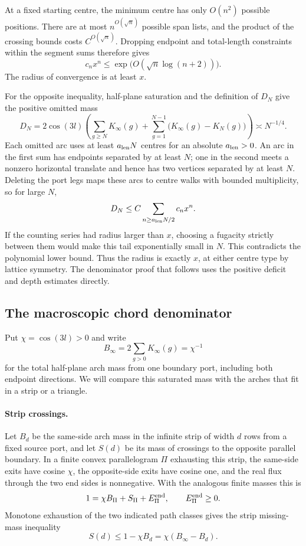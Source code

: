 At a fixed starting centre, the minimum centre has only $O(n^2)$
possible positions. There are at most $n^{O(\sqrt n)}$ possible span
lists, and the product of the crossing bounds costs
$C^{O(\sqrt n)}$. Dropping endpoint and total-length constraints within
the segment sums therefore gives
\[
 c_nx^n\le \exp\bigl(O(\sqrt n\log(n+2))\bigr).
\]
The radius of convergence is at least $x$.

For the opposite inequality, half-plane saturation and the definition
of $D_N$ give the positive omitted mass
\[
 D_N=2\cos(3l)\left(
       \sum_{g\ge N}K_\infty(g)
       +\sum_{g=1}^{N-1}\bigl(K_\infty(g)-K_N(g)\bigr)\right)
       \asymp N^{-1/4}.
\]
Each omitted arc uses at least $a_{\rm len}N$ centres for an absolute
$a_{\rm len}>0$.
An arc in the first sum has endpoints separated by at least $N$; one
in the second meets a nonzero horizontal translate and hence has two
vertices separated by at least $N$. Deleting the port legs maps these
arcs to centre walks with bounded multiplicity, so for large $N$,
\[
 D_N\le C\sum_{n\ge a_{\rm len}N/2}c_nx^n.
\]
If the counting series had radius larger than $x$, choosing a fugacity
strictly between them would make this tail exponentially small in $N$.
This contradicts the polynomial lower bound. Thus the
radius is exactly $x$, at either centre type by lattice symmetry.
The denominator proof that follows uses the positive deficit and depth
estimates directly.

\subsection{The macroscopic chord denominator}

Put $\chi=\cos(3l)>0$ and write
\[
 B_\infty=2\sum_{g>0}K_\infty(g)=\chi^{-1}
\]
for the total half-plane arch mass from one boundary port, including both
endpoint directions. We will compare this saturated mass with the arches
that fit in a strip or a triangle.

\paragraph{Strip crossings.}
Let $B_d$ be the same-side arch mass in the infinite strip of width $d$
rows from a fixed source port, and let $S(d)$ be its mass of crossings to
the opposite parallel boundary. In a finite convex parallelogram
$\Pi$ exhausting this strip, the same-side exits have cosine $\chi$,
the opposite-side exits have cosine one, and the real flux through the
two end sides is nonnegative. With the analogous finite masses this is
\[
 1=\chi B_\Pi+S_\Pi+E_\Pi^{\rm end},
 \qquad E_\Pi^{\rm end}\ge0.
\]
Monotone exhaustion of the two indicated path classes gives the strip
missing-mass inequality
\begin{equation}\label{eq:strip-missing-mass}
 S(d)\le 1-\chi B_d=\chi(B_\infty-B_d).
\end{equation}

